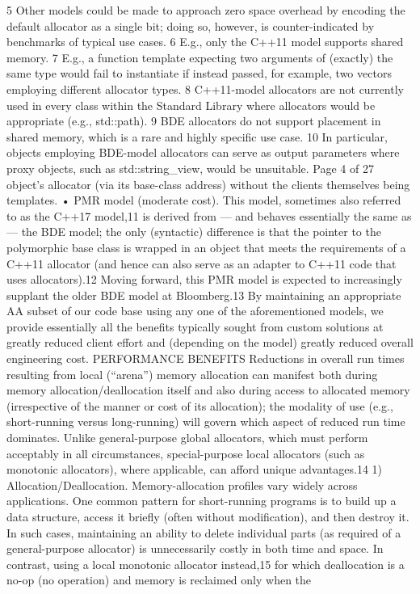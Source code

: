5 Other models could be made to approach zero space overhead by encoding the default allocator as a
single bit; doing so, however, is counter-indicated by benchmarks of typical use cases. 6 E.g., only the C++11 model supports shared memory.
7 E.g., a function template expecting two arguments of (exactly) the same type would fail to
instantiate if instead passed, for example, two vectors employing different allocator types.
8 C++11-model allocators are not currently used in every class within the Standard Library where
allocators would be appropriate (e.g., std::path).
9 BDE allocators do not support placement in shared memory, which is a rare and highly specific use
case. 10 In particular, objects employing BDE-model allocators can serve as output parameters where proxy
objects, such as std::string_view, would be unsuitable.
Page 4 of 27
object’s allocator (via its base-class address) without the clients themselves being
templates.
• PMR model (moderate cost). This model, sometimes also referred to as the
C++17 model,11 is derived from — and behaves essentially the same as — the
BDE model; the only (syntactic) difference is that the pointer to the polymorphic
base class is wrapped in an object that meets the requirements of a C++11
allocator (and hence can also serve as an adapter to C++11 code that uses
allocators).12 Moving forward, this PMR model is expected to increasingly
supplant the older BDE model at Bloomberg.13
By maintaining an appropriate AA subset of our code base using any one of the
aforementioned models, we provide essentially all the benefits typically sought from
custom solutions at greatly reduced client effort and (depending on the model)
greatly reduced overall engineering cost.
PERFORMANCE BENEFITS
Reductions in overall run times resulting from local (“arena”) memory allocation can
manifest both during memory allocation/deallocation itself and also during access
to allocated memory (irrespective of the manner or cost of its allocation); the
modality of use (e.g., short-running versus long-running) will govern which aspect of
reduced run time dominates. Unlike general-purpose global allocators, which must
perform acceptably in all circumstances, special-purpose local allocators (such as
monotonic allocators), where applicable, can afford unique advantages.14
1) Allocation/Deallocation. Memory-allocation profiles vary widely across
applications. One common pattern for short-running programs is to build up
a data structure, access it briefly (often without modification), and then
destroy it. In such cases, maintaining an ability to delete individual parts (as
required of a general-purpose allocator) is unnecessarily costly in both time
and space. In contrast, using a local monotonic allocator instead,15 for which
deallocation is a no-op (no operation) and memory is reclaimed only when the

